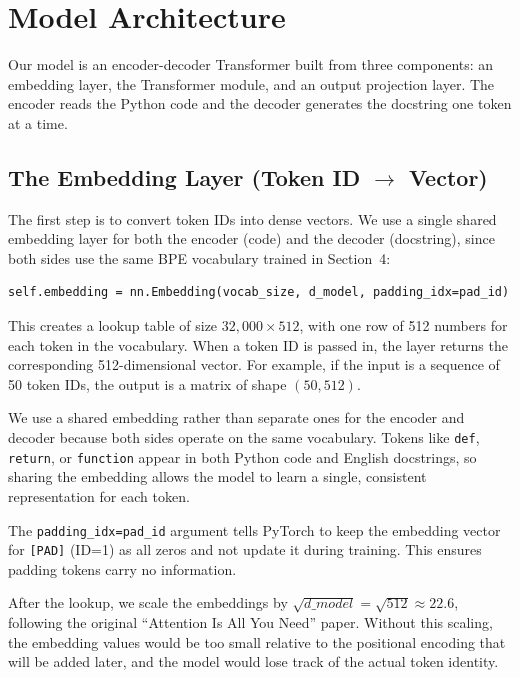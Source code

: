 \documentclass[11pt]{article}
\begin{document}
\section{Model Architecture}

Our model is an encoder-decoder Transformer built from three components: an embedding layer, the Transformer module, and an output projection layer. The encoder reads the Python code and the decoder generates the docstring one token at a time.

\subsection{The Embedding Layer (Token ID $\rightarrow$ Vector)}

The first step is to convert token IDs into dense vectors. We use a single shared embedding layer for both the encoder (code) and the decoder (docstring), since both sides use the same BPE vocabulary trained in Section~4:

\begin{lstlisting}[style=python]
self.embedding = nn.Embedding(vocab_size, d_model, padding_idx=pad_id)
\end{lstlisting}

This creates a lookup table of size $32{,}000 \times 512$, with one row of 512 numbers for each token in the vocabulary. When a token ID is passed in, the layer returns the corresponding 512-dimensional vector. For example, if the input is a sequence of 50 token IDs, the output is a matrix of shape $(50, 512)$.

We use a shared embedding rather than separate ones for the encoder and decoder because both sides operate on the same vocabulary. Tokens like \texttt{def}, \texttt{return}, or \texttt{function} appear in both Python code and English docstrings, so sharing the embedding allows the model to learn a single, consistent representation for each token.

The \texttt{padding\_idx=pad\_id} argument tells PyTorch to keep the embedding vector for \texttt{[PAD]} (ID=1) as all zeros and not update it during training. This ensures padding tokens carry no information.

After the lookup, we scale the embeddings by $\sqrt{d\_model} = \sqrt{512} \approx 22.6$, following the original ``Attention Is All You Need'' paper. Without this scaling, the embedding values would be too small relative to the positional encoding that will be added later, and the model would lose track of the actual token identity.
\end{document}
